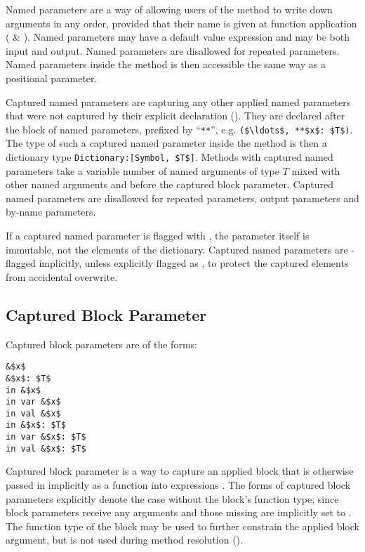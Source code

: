 Named parameters are a way of allowing users of the method to write down arguments in any order, provided that their name is given at function application ( \& ). Named parameters may have a default value expression and may be both input and output. Named parameters are disallowed for repeated parameters. Named parameters inside the method is then accessible the same way as a positional parameter. 

Captured named parameters are capturing any other applied named parameters that were not captured by their explicit declaration (). They are declared after the block of named parameters, prefixed by ``\lstinline!**!'', e.g. \lstinline!($\ldots$, **$x$: $T$)!. The type of such a captured named parameter inside the method is then a dictionary type \lstinline!Dictionary:[Symbol, $T$]!. Methods with captured named parameters take a variable number of named arguments of type $T$ mixed with other named arguments and before the captured block parameter. Captured named parameters are disallowed for repeated parameters, output parameters and by-name parameters. 

If a captured named parameter is flagged with , the parameter itself is immutable, not the elements of the dictionary. Captured named parameters are -flagged implicitly, unless explicitly flagged as , to protect the captured elements from accidental overwrite. 

\subsection{Captured Block Parameter}
\label{sec:captured-block-parameter}

Captured block parameters are of the forms:
\begin{lstlisting}
&$x$
&$x$: $T$
in &$x$
in var &$x$
in val &$x$
in &$x$: $T$
in var &$x$: $T$
in val &$x$: $T$
\end{lstlisting}

Captured block parameter is a way to capture an applied block that is otherwise passed in implicitly as a function into  expressions . The forms of captured block parameters explicitly denote the case without the block's function type, since block parameters receive any arguments and those missing are implicitly set to . The function type of the block may be used to further constrain the applied block argument, but is not used during method resolution (). 

